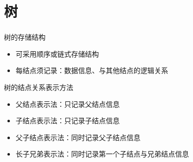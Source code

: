 \section{树}


\begin{frame}
    \frametitle{\insertsectionhead}
    \begin{block}{树的存储结构}
        \begin{itemize}
            \item 可采用\alert{顺序}或\alert{链式}存储结构
            \item 每结点须记录：数据信息、与其他结点的逻辑关系
        \end{itemize}
    \end{block}
    \pause
    \begin{block}{树的结点关系表示方法}
        \begin{itemize}
            \item 父结点表示法：只记录父结点信息
            \item 子结点表示法：只记录子结点信息
            \item 父子结点表示法：同时记录父子结点信息
            \item 长子兄弟表示法：同时记录第一个子结点与兄弟结点信息
        \end{itemize}
    \end{block}
\end{frame}

